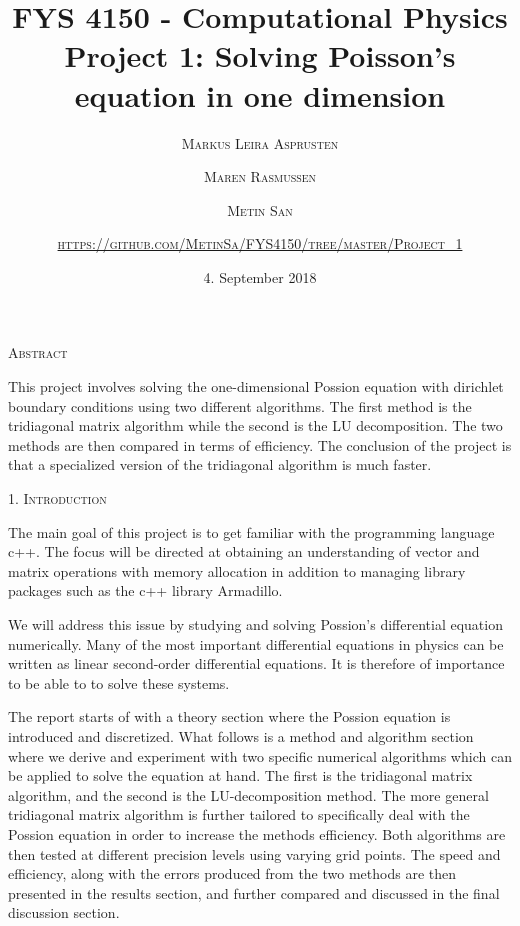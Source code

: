 \documentclass[a4paper,10pt]{article}
\title{FYS 4150 - Computational Physics\\
 Project 1: Solving Poisson's equation in one dimension 
}
\date{\normalsize{4. September 2018} }
\author{\textsc{\small{Markus Leira Asprusten}}
\and \textsc{\small{Maren Rasmussen}}\and \textsc{\small{Metin San}} \and
\textsc{\small\url{https://github.com/MetinSa/FYS4150/tree/master/Project_1}}
 }
\begin{document}
\maketitle

\begin{center}
\textsc{Abstract}
\end{center}

\begin{adjustwidth}{7mm}{7mm}

This project involves solving the one-dimensional Possion equation with dirichlet boundary conditions using two different algorithms. The first method is the tridiagonal matrix algorithm while the second is the LU decomposition. The two methods are then compared in terms of efficiency. The conclusion of the project is that a specialized version of the tridiagonal algorithm is much faster.

\end{adjustwidth}



\bigskip

\begin{center}
\textsc{1. Introduction}
\end{center}
The main goal of this project is to get familiar with the programming language c++. The focus will be directed at obtaining an understanding of vector and matrix operations with memory allocation in addition to managing library packages such as the c++ library Armadillo. 

We will address this issue by studying and solving Possion's differential equation numerically. Many of the most important differential equations in physics can be written as linear second-order differential equations. It is therefore of importance to be able to to solve these systems. 

The report starts of with a theory section where the Possion equation is introduced and discretized.  What follows is a method and algorithm section where we derive and experiment with two specific numerical algorithms which can be applied to solve the equation at hand. The first is the tridiagonal matrix algorithm, and the second is the LU-decomposition method. The more general tridiagonal matrix algorithm is further tailored to specifically deal with the Possion equation in order to increase the methods efficiency. Both algorithms are then tested at different precision levels using varying grid points. The speed and efficiency, along with the errors produced from the two methods are then presented in the results section, and further compared and discussed in the final discussion section.
\end{document}
